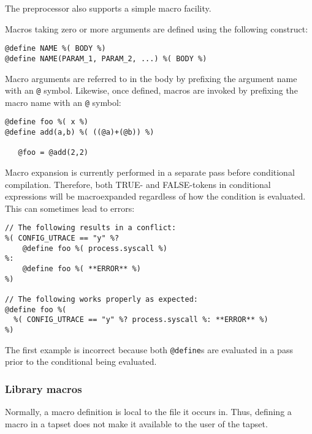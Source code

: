 \documentclass[twoside,english]{article}
\newenvironment{vindent}
{\begin{list}{}{\setlength{\listparindent}{6pt}}
\item[]}
{\end{list}}
\begin{document}
The preprocessor also supports a simple macro facility.

Macros taking zero or more arguments are defined using the following
construct:

\begin{vindent}
\begin{verbatim}
@define NAME %( BODY %)
@define NAME(PARAM_1, PARAM_2, ...) %( BODY %)
\end{verbatim}
\end{vindent}

Macro arguments are referred to in the body by prefixing the argument
name with an \texttt{@} symbol. Likewise, once defined, macros are
invoked by prefixing the macro name with an \texttt{@} symbol:

\begin{vindent}
\begin{verbatim}
@define foo %( x %)
@define add(a,b) %( ((@a)+(@b)) %)

   @foo = @add(2,2)
\end{verbatim}
\end{vindent}

Macro expansion is currently performed in a separate pass before
conditional compilation. Therefore, both TRUE- and FALSE-tokens in
conditional expressions will be macroexpanded regardless of how the
condition is evaluated. This can sometimes lead to errors:

\begin{vindent}
\begin{verbatim}
// The following results in a conflict:
%( CONFIG_UTRACE == "y" %?
    @define foo %( process.syscall %)
%:
    @define foo %( **ERROR** %)
%)

// The following works properly as expected:
@define foo %(
  %( CONFIG_UTRACE == "y" %? process.syscall %: **ERROR** %)
%)
\end{verbatim}
\end{vindent}

The first example is incorrect because both \texttt{@define}s are
evaluated in a pass prior to the conditional being evaluated.

\subsubsection{Library macros}

Normally, a macro definition is local to the file it occurs in. Thus,
defining a macro in a tapset does not make it available to the user of
the tapset.
\end{document}
